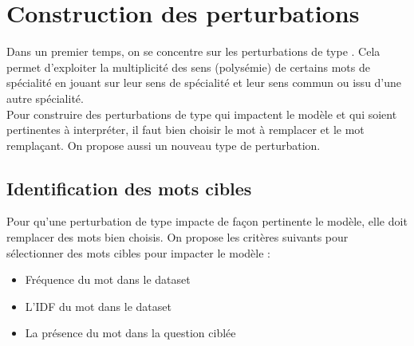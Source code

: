 \section{Construction des perturbations}

    Dans un premier temps, on se concentre sur les perturbations de type \replace. Cela permet d'exploiter la multiplicité des sens (polysémie) de certains mots de spécialité en jouant sur leur sens de spécialité et leur sens commun ou issu d'une autre spécialité. \\
    Pour construire des perturbations de type \replace qui impactent le modèle et qui soient pertinentes à interpréter, il faut bien choisir le mot à remplacer et le mot remplaçant. On propose aussi un nouveau type de perturbation.

    \subsection{Identification des mots cibles}


        Pour qu'une perturbation de type \replace impacte de façon pertinente le modèle, elle doit remplacer des mots bien choisis.
        On propose les critères suivants pour sélectionner des mots cibles pour impacter le modèle :
        \begin{itemize}
            \item Fréquence du mot dans le dataset
            \item L'IDF du mot dans le dataset
            \item La présence du mot dans la question ciblée
        \end{itemize}

